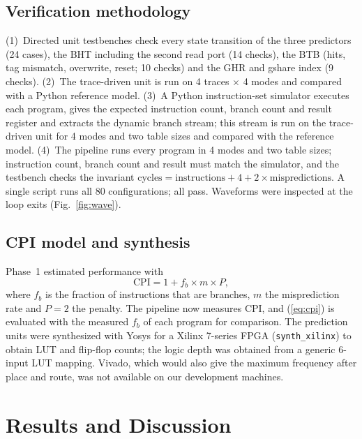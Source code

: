 \documentclass[conference]{IEEEtran}
\begin{document}
\subsection{Verification methodology}
(1)~Directed unit testbenches check every state transition of the three predictors (24 cases),
the BHT including the second read port (14 checks), the BTB (hits, tag mismatch, overwrite,
reset; 10 checks) and the GHR and gshare index (9 checks). (2)~The trace-driven unit is run on
4 traces $\times$ 4 modes and compared with a Python reference model. (3)~A Python
instruction-set simulator executes each program, gives the expected instruction count, branch
count and result register and extracts the dynamic branch stream; this stream is run on the
trace-driven unit for 4 modes and two table sizes and compared with the reference model.
(4)~The pipeline runs every program in 4 modes and two table sizes; instruction count, branch
count and result must match the simulator, and the testbench checks the invariant
$\text{cycles} = \text{instructions} + 4 + 2 \times \text{mispredictions}$. A single script runs
all 80 configurations; all pass. Waveforms were inspected at the loop exits
(Fig.~\ref{fig:wave}).

\subsection{CPI model and synthesis}
Phase~1 estimated performance with
\begin{equation}
\mathrm{CPI} = 1 + f_b \times m \times P,
\label{eq:cpi}
\end{equation}
where $f_b$ is the fraction of instructions that are branches, $m$ the misprediction rate and
$P = 2$ the penalty. The pipeline now measures CPI, and (\ref{eq:cpi}) is evaluated with the
measured $f_b$ of each program for comparison. The prediction units were synthesized with Yosys
for a Xilinx 7-series FPGA (\texttt{synth\_xilinx}) to obtain LUT and flip-flop counts; the
logic depth was obtained from a generic 6-input LUT mapping. Vivado, which would also give the
maximum frequency after place and route, was not available on our development machines.

\section{Results and Discussion}
\end{document}
